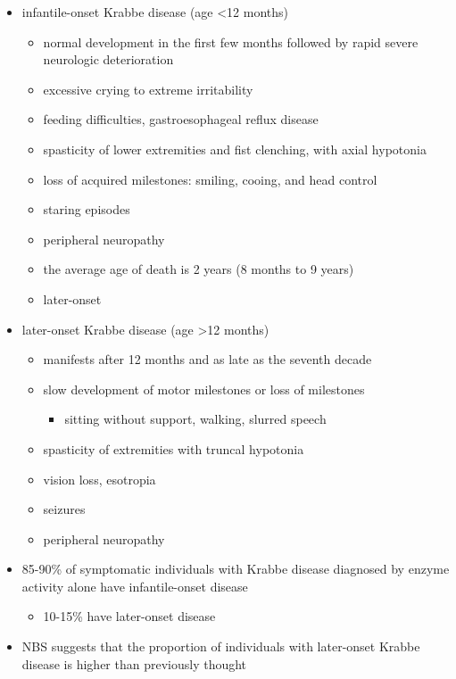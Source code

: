 \documentclass[fontsize=12pt]{scrartcl}
\begin{document}
\begin{enumerate}
\begin{enumerate}
\begin{enumerate}
\begin{enumerate}
\begin{table}[htbp]
\begin{enumerate}
\begin{enumerate}
\begin{table}[htbp]
\begin{enumerate}
\begin{itemize}
\begin{itemize}
\begin{enumerate}
\begin{enumerate}
\begin{enumerate}
\begin{itemize}

\item infantile-onset Krabbe disease (age <12 months)

\begin{itemize}
\item normal development in the first few months followed by rapid
severe neurologic deterioration
\item excessive crying to extreme irritability
\item feeding difficulties, gastroesophageal reflux disease
\item spasticity of lower extremities and fist clenching, with axial hypotonia
\item loss of acquired milestones: smiling, cooing, and head control
\item staring episodes
\item peripheral neuropathy
\item the average age of death is 2 years (8 months to 9 years)

\item{later-onset} 
\end{itemize}
\item later-onset Krabbe disease (age >12 months)
\begin{itemize}
\item manifests after 12 months and as late as the seventh decade
\item slow development of motor milestones or loss of milestones
\begin{itemize}
\item sitting without support, walking, slurred speech
\end{itemize}
\item spasticity of extremities with truncal hypotonia
\item vision loss, esotropia
\item seizures
\item peripheral neuropathy
\end{itemize}

\item 85-90\% of symptomatic individuals with Krabbe disease diagnosed by
enzyme activity alone have infantile-onset disease
\begin{itemize}
\item 10-15\% have later-onset disease
\end{itemize}
\item NBS suggests that the proportion of individuals with later-onset
Krabbe disease is higher than previously thought
\end{itemize}


\end{enumerate}
\end{enumerate}
\end{enumerate}
\end{itemize}
\end{itemize}
\end{enumerate}
\end{table}
\end{enumerate}
\end{enumerate}
\end{table}
\end{enumerate}
\end{enumerate}
\end{enumerate}
\end{enumerate}
\end{document}
